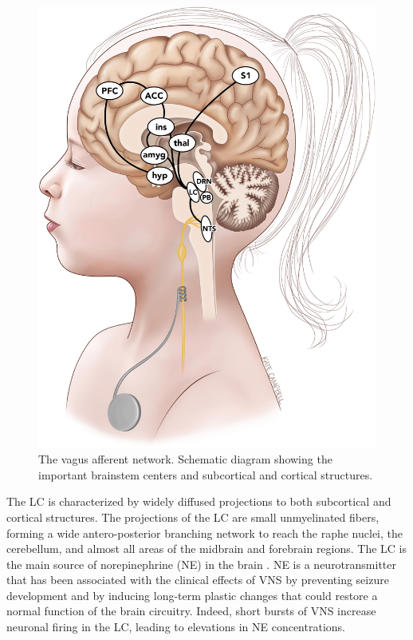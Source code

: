   \begin{figure}[h]
    \begin{minipage}[c]{0.5\textwidth}
      \includegraphics[width=\textwidth]{images/vagus_afferent_network.jpg}
    \end{minipage}\hfill
    \begin{minipage}[c]{0.5\textwidth}
      \caption{The vagus afferent network. Schematic diagram showing the important brainstem centers and subcortical and cortical structures. \cite{campbell, HanchemWongIbrahim2018}} 
    \end{minipage}
    \centering
    \label{fig:Vagus Afferent Network}
  \end{figure}

  The LC is characterized by widely diffused projections to both subcortical and cortical structures. The projections of the LC are small unmyelinated fibers, forming a wide antero-posterior branching network to reach the raphe nuclei, the cerebellum, and almost all areas of the midbrain and forebrain regions. The LC is the main source of norepinephrine (NE) in the brain \cite{AGHAJANIAN1977570}. NE is a neurotransmitter that has been associated with the clinical effects of VNS by preventing seizure development and by inducing long-term plastic changes that could restore a normal function of the brain circuitry. Indeed, short bursts of VNS increase neuronal firing in the LC, leading to elevations in NE concentrations. \cite{BergerVespa2021}

